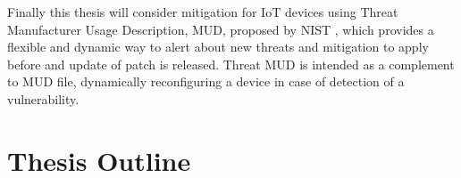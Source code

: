 Finally this thesis will consider mitigation for IoT devices using Threat Manufacturer Usage Description, MUD, proposed by NIST
\cite{dodson2021securing}, which provides a flexible and dynamic way to alert about new threats and mitigation to apply
before and update of patch is released. Threat MUD is intended as a complement to MUD file, dynamically reconfiguring a
device in case of detection of a vulnerability.

\section{Thesis Outline}
